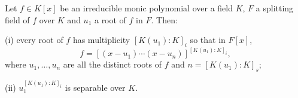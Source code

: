 Let $f \in K[x]$ be an irreducible monic polynomial over a field $K$, $F$ a splitting field of $f$ over $K$ and $u_1$ a root of $f$ in $F$. Then:

(i) every root of $f$ has multiplicity $[K(u_1) : K]_i$ so that in $F[x]$,
$$f = \left[(x - u_1) \cdots (x - u_n)\right]^{[K(u_1) : K]_i},$$
where $u_1, \ldots, u_n$ are all the distinct roots of $f$ and $n = [K(u_1) : K]_s$;

(ii) $u_1^{[K(u_1) : K]_i}$ is separable over $K$.
